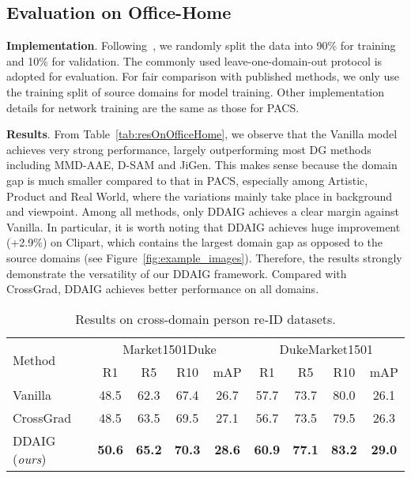 \documentclass[letterpaper]{article}
\newcommand{\keypoint}[1]{\vspace{0.1cm}\noindent\textbf{#1}}
\newcommand{\tableCellHeight}{1.1}
\begin{document}
\subsection{Evaluation on Office-Home}

\keypoint{Implementation}.
Following~\cite{d2018domain,cvpr19JiGen}, we randomly split the data into 90\% for training and 10\% for validation. The commonly used leave-one-domain-out protocol is adopted for evaluation. For fair comparison with published methods, we only use the training split of source domains for model training. Other implementation details for network training are the same as those for PACS.

\keypoint{Results}.
From Table~\ref{tab:resOnOfficeHome}, we observe that the Vanilla model achieves very strong performance, largely outperforming most DG methods including MMD-AAE, D-SAM and JiGen. This makes sense because the domain gap is much smaller compared to that in PACS, especially among Artistic, Product and Real World, where the variations mainly take place in background and viewpoint. Among all methods, only DDAIG achieves a clear margin against Vanilla. In particular, it is worth noting that DDAIG achieves huge improvement (+2.9\%) on Clipart, which contains the largest domain gap as opposed to the source domains (see Figure~\ref{fig:example_images}). Therefore, the results strongly demonstrate the versatility of our DDAIG framework. Compared with CrossGrad, DDAIG achieves better performance on all domains.


\begin{table}[t]
\setlength{\tabcolsep}{2.8pt}
\renewcommand{\arraystretch}{\tableCellHeight}
\centering
\footnotesize
\caption{Results on cross-domain person re-ID datasets.}
\label{tab:xdomainreid}
\begin{tabular}{l | c c c c | c c c c}
\hline
\multirow{2}{*}{Method} & \multicolumn{4}{c|}{Market1501Duke} & \multicolumn{4}{c}{DukeMarket1501} \\
 & R1 & R5 & R10 & mAP & R1 & R5 & R10 & mAP \\
\hline
Vanilla & 48.5 & 62.3 & 67.4 & 26.7 & {57.7} & 73.7 & {80.0} & 26.1 \\
CrossGrad & 48.5 & 63.5 & {69.5} & 27.1 & 56.7 & 73.5 & 79.5 & {26.3} \\
DDAIG (\emph{ours}) & \textbf{50.6} & \textbf{65.2} & \textbf{70.3} & \textbf{28.6} & \textbf{60.9} & \textbf{77.1} & \textbf{83.2} & \textbf{29.0} \\
\hline
\end{tabular}
\vspace{-0.1cm}
\end{table}
\end{document}
